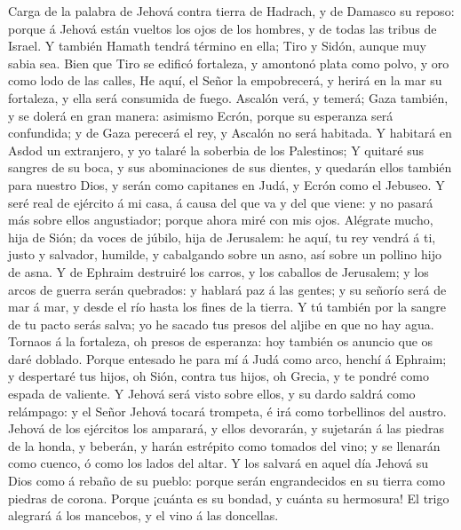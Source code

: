  Carga de la palabra de Jehová contra tierra de Hadrach, y
de Damasco su reposo: porque á Jehová están vueltos los ojos de los
hombres, y de todas las tribus de Israel.  Y también Hamath
tendrá término en ella; Tiro y Sidón, aunque muy sabia sea. 
Bien que Tiro se edificó fortaleza, y amontonó plata como polvo, y oro
como lodo de las calles,  He aquí, el Señor la empobrecerá,
y herirá en la mar su fortaleza, y ella será consumida de fuego.
 Ascalón verá, y temerá; Gaza también, y se dolerá en gran
manera: asimismo Ecrón, porque su esperanza será confundida; y de Gaza
perecerá el rey, y Ascalón no será habitada.  Y habitará en
Asdod un extranjero, y yo talaré la soberbia de los Palestinos;
 Y quitaré sus sangres de su boca, y sus abominaciones de
sus dientes, y quedarán ellos también para nuestro Dios, y serán como
capitanes en Judá, y Ecrón como el Jebuseo.  Y seré real de
ejército á mi casa, á causa del que va y del que viene: y no pasará más
sobre ellos angustiador; porque ahora miré con mis ojos. 
Alégrate mucho, hija de Sión; da voces de júbilo, hija de Jerusalem: he
aquí, tu rey vendrá á ti, justo y salvador, humilde, y cabalgando sobre
un asno, así sobre un pollino hijo de asna.  Y de Ephraim
destruiré los carros, y los caballos de Jerusalem; y los arcos de guerra
serán quebrados: y hablará paz á las gentes; y su señorío será de mar á
mar, y desde el río hasta los fines de la tierra.  Y tú
también por la sangre de tu pacto serás salva; yo he sacado tus presos
del aljibe en que no hay agua.  Tornaos á la fortaleza, oh
presos de esperanza: hoy también os anuncio que os daré doblado.
 Porque entesado he para mí á Judá como arco, henchí á
Ephraim; y despertaré tus hijos, oh Sión, contra tus hijos, oh Grecia, y
te pondré como espada de valiente.  Y Jehová será visto
sobre ellos, y su dardo saldrá como relámpago: y el Señor Jehová tocará
trompeta, é irá como torbellinos del austro.  Jehová de los
ejércitos los amparará, y ellos devorarán, y sujetarán á las piedras de
la honda, y beberán, y harán estrépito como tomados del vino; y se
llenarán como cuenco, ó como los lados del altar.  Y los
salvará en aquel día Jehová su Dios como á rebaño de su pueblo: porque
serán engrandecidos en su tierra como piedras de corona. 
Porque ¡cuánta es su bondad, y cuánta su hermosura! El trigo alegrará á
los mancebos, y el vino á las doncellas.

